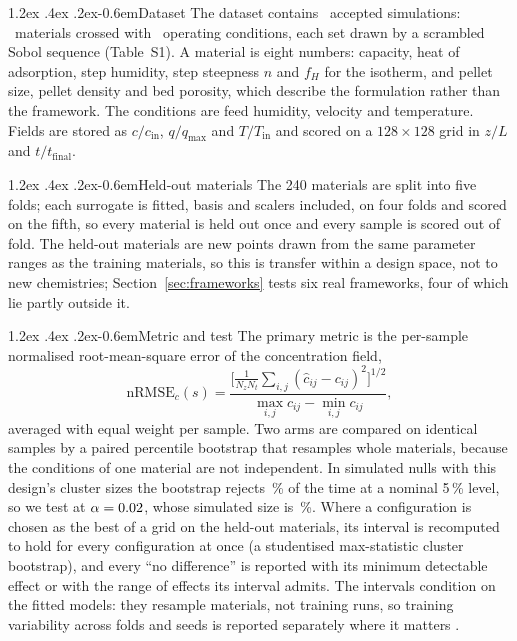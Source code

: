 \documentclass[10pt,a4paper]{article}
\makeatletter
\renewcommand\paragraph{\@startsection{paragraph}{4}{\z@}%
  {1.2ex \@plus .4ex \@minus .2ex}{-0.6em}{\normalfont\normalsize\bfseries}}
\makeatother
\begin{document}
\paragraph{Dataset} The dataset contains \nDataNsamples\ accepted simulations: \nDataNmaterials\
materials crossed with \nDataNconditions\ operating conditions, each set drawn by a
scrambled Sobol sequence (Table~S1). A material is eight numbers: capacity, heat of
adsorption, step humidity, step steepness \(n\) and \(f_H\) for the isotherm, and pellet
size, pellet density and bed porosity, which describe the formulation rather than the
framework. The conditions are feed humidity, velocity and temperature. Fields are
stored as \(c/c_{\mathrm{in}}\), \(q/q_{\max}\) and \(T/T_{\mathrm{in}}\) and scored on a
\(128 \times 128\) grid in \(z/L\) and \(t/t_{\mathrm{final}}\).

\paragraph{Held-out materials} The 240 materials are split into five folds; each surrogate is
fitted, basis and scalers included, on four folds and scored on the fifth, so every
material is held out once and every sample is scored out of fold. The held-out materials
are new points drawn from the same parameter ranges as the training materials, so this is
transfer within a design space, not to new chemistries; Section~\ref{sec:frameworks}
tests six real frameworks, four of which lie partly outside it.

\paragraph{Metric and test} The primary metric is the per-sample normalised root-mean-square
error of the concentration field,
\begin{equation}
\mathrm{nRMSE}_c(s) = \frac{\bigl[\tfrac{1}{N_zN_t}\sum_{i,j}(\hat c_{ij}-c_{ij})^2\bigr]^{1/2}}
{\max_{i,j} c_{ij} - \min_{i,j} c_{ij}} ,
\label{eq:nrmse}
\end{equation}
averaged with equal weight per sample. Two arms are compared on identical samples by a
paired percentile bootstrap that resamples whole materials, because the conditions of one
material are not independent. In simulated nulls with this design's cluster sizes the
bootstrap rejects \nFprFoldsNominal\,\% of the time at a nominal 5\,\% level, so we test at
\(\alpha = 0.02\), whose simulated size is \nFprFoldsCal\,\%. Where a configuration
is chosen as the best of a grid on the held-out materials, its interval is recomputed to
hold for every configuration at once (a studentised max-statistic cluster bootstrap),
and every ``no difference'' is reported with its minimum detectable effect or with the
range of effects its interval admits. The intervals condition on the fitted models: they
resample materials, not training runs, so training variability across folds and seeds is
reported separately where it matters \cite{nadeau2003inference}.
\end{document}
